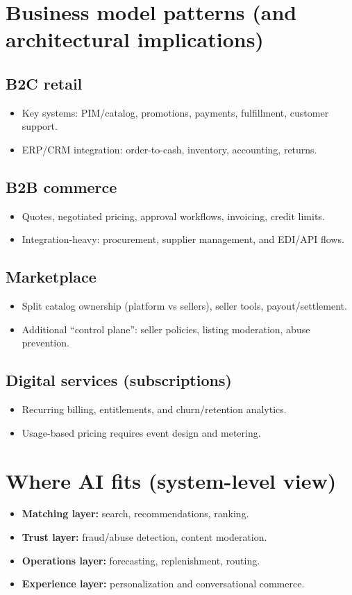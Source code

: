 \section{Business model patterns (and architectural implications)}
\subsection{B2C retail}
\begin{itemize}
  \item Key systems: PIM/catalog, promotions, payments, fulfillment, customer support.
  \item ERP/CRM integration: order-to-cash, inventory, accounting, returns.
\end{itemize}

\subsection{B2B commerce}
\begin{itemize}
  \item Quotes, negotiated pricing, approval workflows, invoicing, credit limits.
  \item Integration-heavy: procurement, supplier management, and EDI/API flows.
\end{itemize}

\subsection{Marketplace}
\begin{itemize}
  \item Split catalog ownership (platform vs sellers), seller tools, payout/settlement.
  \item Additional ``control plane'': seller policies, listing moderation, abuse prevention.
\end{itemize}

\subsection{Digital services (subscriptions)}
\begin{itemize}
  \item Recurring billing, entitlements, and churn/retention analytics.
  \item Usage-based pricing requires event design and metering.
\end{itemize}

\section{Where AI fits (system-level view)}
\begin{itemize}
  \item \textbf{Matching layer:} search, recommendations, ranking.
  \item \textbf{Trust layer:} fraud/abuse detection, content moderation.
  \item \textbf{Operations layer:} forecasting, replenishment, routing.
  \item \textbf{Experience layer:} personalization and conversational commerce.
\end{itemize}

